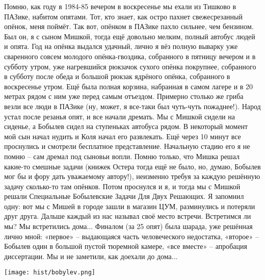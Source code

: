 Помню, как году в 1984-85 вечером в воскресенье мы ехали из Тишково в ПАЗике, набитом опятами. Тот, кто знает, как остро пахнет свежесрезанный опёнок, меня поймёт. Так вот, опёнком в ПАЗике пахло сильнее, чем бензином. Был он, я с сыном Мишкой, тогда ещё довольно мелким, полный автобус людей и опята. Год на опёнка выдался удачный, лично я вёз полную выварку уже сваренного совсем молодого опёнка-гвоздика, собранного в пятницу вечером и в субботу утром, уже нагревшийся рюкзачок сухого опёнка покрупнее, собранного в субботу после обеда и большой рюкзак ядрёного опёнка, собранного в воскресенье утром. Ещё была полная корзина, набранная в самом лагере и в 20 метрах рядом с ним уже перед самым отъездом. Примерно столько же гриба везли все люди в ПАЗике (ну, может, я все-таки был чуть-чуть пожаднее!). Народ устал после резанья опят, и все начали дремать. Мы с Мишкой сидели на сиденье, а Бобылев сидел на ступеньках автобуса рядом. В некоторый момент мой сын начал нудить и Коля начал его развлекать. Ещё через 10 минут все проснулись и смотрели бесплатное представление. Начальную стадию его я не помню – сам дремал под сыновьи вопли. Помню только, что Мишка решал какие-то смешные задачи (книжек Остера тогда ещё не было, но, думаю, Бобылев мог бы и фору дать уважаемому автору!), неизменно требуя за каждую решённую задачу сколько-то там опёнков. Потом  проснулся и я, и тогда мы с Мишкой решали Специальные Бобылевские Задачи Для Двух Решающих. Я запомнил одну: вот мы с Мишей в городе зашли в магазин ЦУМ, разминулись и потеряли друг друга. Дальше каждый из нас называл своё место встречи. Встретимся ли мы? Мы встретились дома... Финалом (за 25 опят) была шарада, уже решённая лично мной: «первое» – выдающаяся часть человеческого недостатка, «второе» – Бобылев один в большой пустой тюремной камере, «все вместе» – апробация диссертации. Мы и не заметили, как доехали до дома...

\begin{center}
	\texttt{[image: hist/bobylev.png]}
\end{center}

